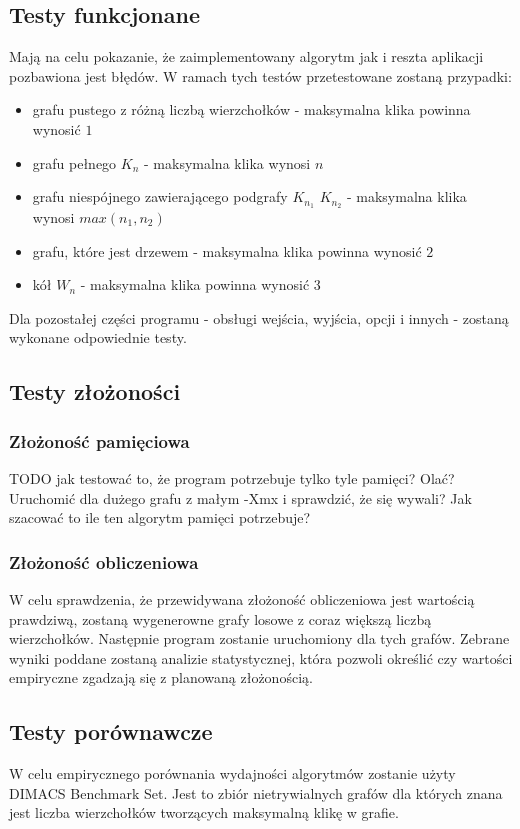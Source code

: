\documentclass[12pt, a4paper]{article}
\begin{document}
\subsection{Testy funkcjonane}
Mają na celu pokazanie, że zaimplementowany algorytm jak i reszta aplikacji pozbawiona jest błędów. W ramach tych testów przetestowane zostaną przypadki:

\begin{itemize}
\item grafu pustego z różną liczbą wierzchołków - maksymalna klika powinna wynosić $1$
\item grafu pełnego $K_{n}$ - maksymalna klika wynosi $n$
\item grafu niespójnego zawierającego podgrafy $K_{n_{1}}$ $K_{n_{2}}$ - maksymalna klika wynosi $max(n_{1}, n_{2})$
\item grafu, które jest drzewem - maksymalna klika powinna wynosić $2$
\item kół $W_{n}$ - maksymalna klika powinna wynosić $3$
\end{itemize}

Dla pozostałej części programu - obsługi wejścia, wyjścia, opcji i innych - zostaną wykonane odpowiednie testy.

\subsection{Testy złożoności}
\subsubsection{Złożoność pamięciowa}
TODO jak testować to, że program potrzebuje tylko tyle pamięci? Olać? Uruchomić dla dużego grafu z małym -Xmx i sprawdzić, że się wywali? Jak szacować to ile ten algorytm pamięci potrzebuje?

\subsubsection{Złożoność obliczeniowa}
W celu sprawdzenia, że przewidywana złożoność obliczeniowa jest wartością prawdziwą, zostaną wygenerowne grafy losowe z coraz większą liczbą wierzchołków. Następnie program zostanie uruchomiony dla tych grafów. Zebrane wyniki poddane zostaną analizie statystycznej, która pozwoli określić czy wartości empiryczne zgadzają się z planowaną złożonością.

\subsection{Testy porównawcze}
W celu empirycznego porównania wydajności algorytmów zostanie użyty DIMACS Benchmark Set\citep{dimacs}. Jest to zbiór nietrywialnych grafów dla których znana jest liczba wierzchołków tworzących maksymalną klikę w grafie.


\nocite{*}


\end{document}

